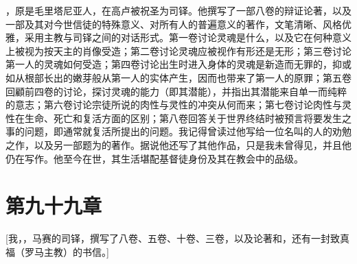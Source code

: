 ，原是毛里塔尼亚人，在高卢被祝圣为司铎。他撰写了一部八卷的辩证论著，以及一部及其对今世信徒的特殊意义、对所有人的普遍意义的著作，文笔清晰、风格优雅，采用主教与司铎之间的对话形式。第一卷讨论灵魂是什么，以及它在何种意义上被视为按天主的肖像受造；第二卷讨论灵魂应被视作有形还是无形；第三卷讨论第一人的灵魂如何受造；第四卷讨论出生时进入身体的灵魂是新造而无罪的，抑或如从根部长出的嫩芽般从第一人的实体产生，因而也带来了第一人的原罪；第五卷回顧前四卷的讨论，探讨灵魂的能力（即其潜能），并指出其潜能来自单一而纯粹的意志；第六卷讨论宗徒所说的肉性与灵性的冲突从何而来；第七卷讨论肉性与灵性在生命、死亡和复活方面的区别；第八卷回答关于世界终结时被预言将要发生之事的问题，即通常就复活所提出的问题。我记得曾读过他写给一位名叫的人的劝勉之作，以及另一部题为的著作。据说他还写了其他作品，只是我未曾得见，并且他仍在写作。他至今在世，其生活堪配基督徒身份及其在教会中的品级。\par


\section{第九十九章}

[我，，马赛的司铎，撰写了八卷、五卷、十卷、三卷，以及论著和，还有一封致真福（罗马主教）的书信。]\par

